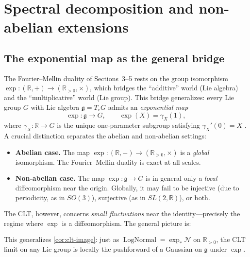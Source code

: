 \documentclass[12pt]{amsart}
\theoremstyle{definition}
\theoremstyle{remark}
\newcommand{\R}{\mathbb{R}}
\newcommand{\Rpos}{\mathbb{R}_{>0}}
\newcommand{\cN}{\mathcal{N}}
\begin{document}
\section{Spectral decomposition and non-abelian extensions}\label{sec:spectral}

\subsection*{The exponential map as the general bridge}

The Fourier--Mellin duality of Sections~3--5 rests on the group isomorphism $\exp : (\R, +) \to (\Rpos, \times)$, which bridges the ``additive'' world (Lie algebra) and the ``multiplicative'' world (Lie group). This bridge generalizes: every Lie group $G$ with Lie algebra $\mathfrak{g} = T_e G$ admits an \emph{exponential map}
\[
\exp : \mathfrak{g} \to G, \qquad \exp(X) = \gamma_X(1),
\]
where $\gamma_X : \R \to G$ is the unique one-parameter subgroup satisfying $\gamma_X'(0) = X$ \cite[Chapter~3]{Hall}. A crucial distinction separates the abelian and non-abelian settings:
\begin{itemize}
\item \textbf{Abelian case.} The map $\exp : (\R, +) \to (\Rpos, \times)$ is a \emph{global} isomorphism. The Fourier--Mellin duality is exact at all scales.
\item \textbf{Non-abelian case.} The map $\exp : \mathfrak{g} \to G$ is in general only a \emph{local} diffeomorphism near the origin. Globally, it may fail to be injective (due to periodicity, as in $SO(3)$), surjective (as in $SL(2, \R)$), or both.
\end{itemize}
The CLT, however, concerns \emph{small fluctuations} near the identity---precisely the regime where $\exp$ is a diffeomorphism. The general picture is:

\begin{center}
\end{center}

\noindent This generalizes \cref{cor:clt-image}: just as $\operatorname{LogNormal} = \exp_*\cN$ on $\Rpos$, the CLT limit on any Lie group is locally the pushforward of a Gaussian on $\mathfrak{g}$ under $\exp$.
\end{document}
